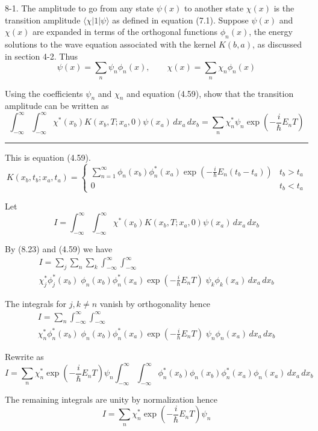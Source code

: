 \documentclass[12pt]{article}
\begin{document}
8-1.
The amplitude to go from any state $\psi(x)$ to another
state $\chi(x)$ is the transition amplitude $\langle\chi|1|\psi\rangle$
as defined in equation (7.1).
Suppose $\psi(x)$ and $\chi(x)$ are expanded in terms of the orthogonal
functions $\phi_n(x)$, the energy solutions to the wave equation associated
with the kernel $K(b,a)$, as discussed in section 4-2. Thus
\begin{equation*}
\psi(x)=\sum_n\psi_n\phi_n(x),\qquad\chi(x)=\sum_n\chi_n\phi_n(x)
\tag{8.23}
\end{equation*}

Using the coefficients $\psi_n$ and $\chi_n$ and equation (4.59),
show that the transition amplitude can be written as
\begin{equation*}
\int_{-\infty}^\infty\int_{-\infty}^\infty
\chi^*(x_b)K(x_b,T;x_a,0)\psi(x_a)\,dx_a\,dx_b
=\sum_n\chi_n^*\psi_n\exp\left(-\frac{i}{\hbar}E_nT\right)
\tag{8.24}
\end{equation*}

\bigskip
\hrule

\bigskip
This is equation (4.59).
\begin{equation*}
K(x_b,t_b;x_a,t_a)=\begin{cases}
\sum_{n=1}^\infty\phi_n(x_b)\phi_n^*(x_a)
\exp\left(-\frac{i}{\hbar}E_n(t_b-t_a)\right) & t_b>t_a
\\
0 & t_b<t_a
\end{cases}
\tag{4.59}
\end{equation*}

Let
\begin{equation*}
I=\int_{-\infty}^\infty\int_{-\infty}^\infty
\chi^*(x_b)K(x_b,T;x_a,0)\psi(x_a)\,dx_a\,dx_b
\end{equation*}

By (8.23) and (4.59) we have
\begin{multline*}
I=\sum_j\sum_n\sum_k\int_{-\infty}^\infty\int_{-\infty}^\infty
\\
\chi_j^*\phi_j^*(x_b)
\;
\phi_n(x_b)\phi_n^*(x_a)\exp\left(-\frac{i}{\hbar}E_nT\right)
\;
\psi_k\phi_k(x_a)
\,dx_a\,dx_b
\end{multline*}

The integrals for $j,k\ne n$ vanish by orthogonality hence
\begin{multline*}
I=\sum_n\int_{-\infty}^\infty\int_{-\infty}^\infty
\\
\chi_n^*\phi_n^*(x_b)
\;
\phi_n(x_b)\phi_n^*(x_a)\exp\left(-\frac{i}{\hbar}E_nT\right)
\;
\psi_n\phi_n(x_a)
\,dx_a\,dx_b
\end{multline*}

Rewrite as
\begin{equation*}
I=\sum_n\chi_n^*\exp\left(-\frac{i}{\hbar}E_nT\right)\psi_n
\int_{-\infty}^\infty\int_{-\infty}^\infty
\phi_n^*(x_b)\phi_n(x_b)
\phi_n^*(x_a)\phi_n(x_a)
\,dx_a\,dx_b
\end{equation*}

The remaining integrals are unity by normalization hence
\begin{equation*}
I=\sum_n\chi_n^*\exp\left(-\frac{i}{\hbar}E_nT\right)\psi_n
\end{equation*}

\end{document}
